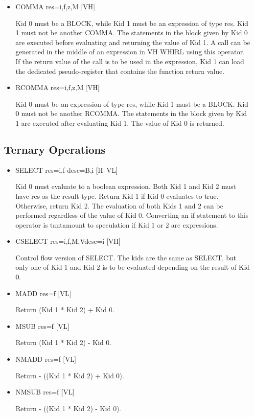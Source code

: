 \documentclass{article}
\begin{document}
\begin{itemize}
\item
{}%
COMMA res=i,f,z,M \hfill [VH]

Kid 0 must be a
%
BLOCK, while Kid 1 must be an expression of type
res. Kid 1 must not be another
%
COMMA. The statements in the block given by
Kid 0 are executed before evaluating and returning the value of
Kid 1. A call can be generated in the middle of an expression in VH
WHIRL using this operator. If the return value of the call is to
be used in the expression, Kid 1 can load the dedicated pseudo-register
that contains the function return value. 

\item
{}%
RCOMMA res=i,f,z,M \hfill [VH]

Kid 0 must be an expression of type res, while Kid 1 must be a
%
BLOCK. Kid 0 must not be another
%
RCOMMA. The statements in the block given by Kid 1 are executed
after evaluating Kid 1. The value of Kid 0 is returned.
\end{itemize}

\subsection{Ternary Operations}

\begin{itemize}
\item
{}%
SELECT res=i,f desc=B,i \hfill [H--VL]

Kid 0 must evaluate to a boolean expression. Both Kid 1 and Kid 2
must have res as the result type. Return Kid 1 if Kid 0 evaluates
to true. Otherwise, return Kid 2. The evaluation of both Kids 1
and 2 can be performed regardless of the value of Kid 0. Converting
an if statement to this operator is tantamount to speculation if
Kid 1 or 2 are expressions. 

\item
{}%
CSELECT res=i,f,M,Vdesc=i \hfill [VH]

Control flow version of
%
SELECT. The kids are the same as
%
SELECT,
but only one of Kid 1 and Kid 2 is to be evaluated depending on the
result of
Kid 0. 

\item
{}%
MADD res=f [VL]

Return (Kid 1 * Kid 2) + Kid 0.

\item
{}%
MSUB res=f [VL]

Return (Kid 1 * Kid 2) - Kid 0.

\item
{}%
NMADD res=f [VL]

Return - ((Kid 1 * Kid 2) + Kid 0).

\item
{}%
NMSUB res=f [VL]

Return - ((Kid 1 * Kid 2) - Kid 0).
\end{itemize}
\end{document}
